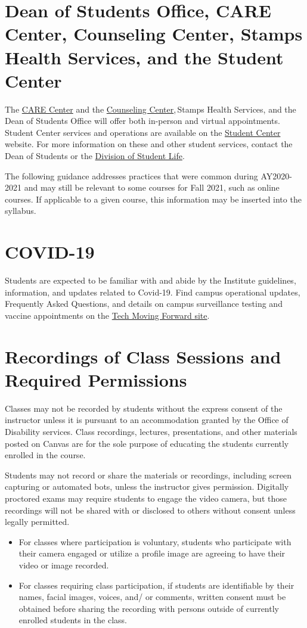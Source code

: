\documentclass{article}
\begin{document}
\section{Dean of Students Office, CARE Center, Counseling Center, Stamps Health Services, and the Student Center}
The \href{https://mentalhealth.gatech.edu/}{CARE Center} and the \href{https://mentalhealth.gatech.edu/}{Counseling Center}, Stamps Health Services, and the Dean of Students Office will offer both in-person and virtual appointments. Student Center services and operations are available on the \href{https://studentcenter.gatech.edu/}{Student Center} website. For more information on these and other student services, contact the Dean of Students or the \href{https://studentlife.gatech.edu/}{Division of Student Life}.

The following guidance addresses practices that were common during AY2020-2021 and may still be relevant to some courses for Fall 2021, such as online courses. If applicable to a given course, this information may be inserted into the syllabus.  

\section{COVID-19}
Students are expected to be familiar with and abide by the Institute guidelines, information, and updates related to Covid-19. Find campus operational updates, Frequently Asked Questions, and details on campus surveillance testing and vaccine appointments on the \href{https://health.gatech.edu/coronavirus}{Tech Moving Forward site}.    

\section{Recordings of Class Sessions and Required Permissions}
Classes may not be recorded by students without the express consent of the instructor unless it is pursuant to an accommodation granted by the Office of Disability services. Class recordings, lectures, presentations, and other materials posted on Canvas are for the sole purpose of educating the students currently enrolled in the course. 

Students may not record or share the materials or recordings, including screen capturing or automated bots, unless the instructor gives permission. Digitally proctored exams may require students to engage the video camera, but those recordings will not be shared with or disclosed to others without consent unless legally permitted.    
\begin{itemize}
    \item For classes where participation is voluntary, students who participate with their camera engaged or utilize a profile image are agreeing to have their video or image recorded. 

    \item  For classes requiring class participation, if students are identifiable by their names, facial images, voices, and/ or comments, written consent must be obtained before sharing the recording with persons outside of currently enrolled students in the class. 
\end{itemize}
\end{document}
